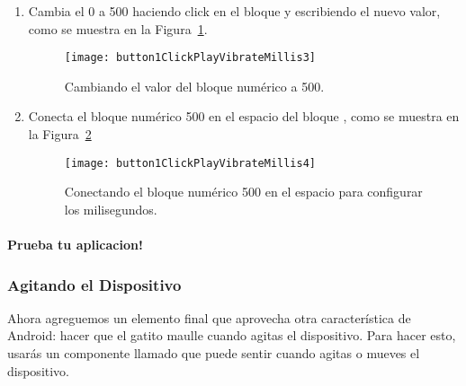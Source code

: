 \begin{enumerate}
\item Cambia el 0 a 500 haciendo click en el bloque y escribiendo el nuevo valor, como se muestra en la Figura~\ref{fig:button1ClickPlayVibrateMillis3}.

  \begin{figure}[H]
    \centering
    \texttt{[image: button1ClickPlayVibrateMillis3]}
    \caption{Cambiando el valor del bloque numérico a 500.}
    \label{fig:button1ClickPlayVibrateMillis3}
  \end{figure}

\item Conecta el bloque numérico 500 en el espacio del bloque , como se muestra en la Figura~\ref{fig:button1ClickPlayVibrateMillis4}

  \begin{figure}[H]
    \centering
    \texttt{[image: button1ClickPlayVibrateMillis4]}
    \caption{Conectando el bloque numérico 500 en el espacio para configurar los milisegundos.}
    \label{fig:button1ClickPlayVibrateMillis4}
  \end{figure}

\end{enumerate}

\paragraph{Prueba tu aplicacion!}

\subsubsection*{Agitando el Dispositivo}

Ahora agreguemos un elemento final que aprovecha otra característica de Android: hacer que el gatito maulle cuando agitas el dispositivo. Para hacer esto, usarás un componente llamado  que puede sentir cuando agitas o mueves el dispositivo.

